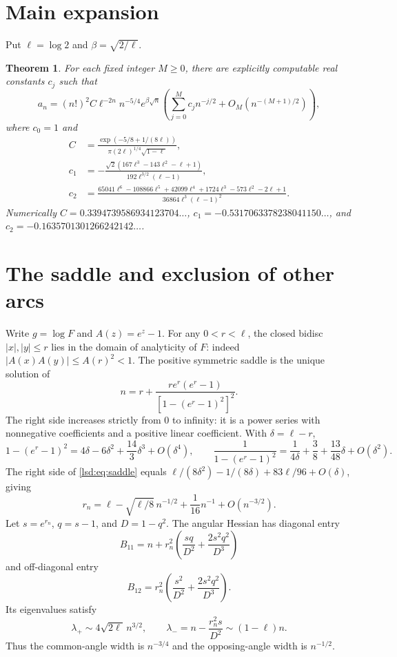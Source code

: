\documentclass[11pt]{article}
\newtheorem{theorem}{Theorem}
\theoremstyle{remark}\newtheorem{remark}{Remark}
\begin{document}
\section{Main expansion}
Put $\ell=\log 2$ and $\beta=\sqrt{2/\ell}$.
\begin{theorem}\label{lsd:thm:asympt}
For each fixed integer $M\geq0$, there are explicitly computable real constants $c_j$ such that
\begin{equation}\label{lsd:eq:main}
 a_n=(n!)^2 C\ell^{-2n}n^{-5/4}e^{\beta\sqrt n}
 \left(\sum_{j=0}^M c_j n^{-j/2}+O_M(n^{-(M+1)/2})\right),
\end{equation}
where $c_0=1$ and
\begin{align}
 C&=\frac{\exp(-5/8+1/(8\ell))}{\pi(2\ell)^{1/4}\sqrt{1-\ell}},\label{lsd:eq:C}\\
 c_1&=-\frac{\sqrt2(167\ell^3-143\ell^2-\ell+1)}{192\ell^{3/2}(\ell-1)},\label{lsd:eq:c1}\\
 c_2&=\frac{65041\ell^6-108866\ell^5+42099\ell^4+1724\ell^3-573\ell^2-2\ell+1}
 {36864\ell^3(\ell-1)^2}.\label{lsd:eq:c2}
\end{align}
Numerically $C=0.3394739586934123704\ldots$,
$c_1=-0.5317063378238041150\ldots$, and
$c_2=-0.1635701301266242142\ldots$.
\end{theorem}

\section{The saddle and exclusion of other arcs}
Write $g=\log F$ and $A(z)=e^z-1$. For any $0<r<\ell$, the closed bidisc $|x|,|y|\leq r$ lies in the domain of analyticity of $F$: indeed
$|A(x)A(y)|\leq A(r)^2<1$.
The positive symmetric saddle is the unique solution of
\begin{equation}\label{lsd:eq:saddle}
 n=r+\frac{re^r(e^r-1)}{[1-(e^r-1)^2]^2}.
\end{equation}
The right side increases strictly from $0$ to infinity: it is a power series with nonnegative coefficients and a positive linear coefficient. With $\delta=\ell-r$,
\[
1-(e^r-1)^2=4\delta-6\delta^2+\frac{14}{3}\delta^3+O(\delta^4),\qquad
\frac1{1-(e^r-1)^2}=\frac1{4\delta}+\frac38+\frac{13}{48}\delta+O(\delta^2).
\]
The right side of \eqref{lsd:eq:saddle} equals
$\ell/(8\delta^2)-1/(8\delta)+83\ell/96+O(\delta)$, giving
\[
 r_n=\ell-\sqrt{\ell/8}\,n^{-1/2}+\frac1{16}n^{-1}+O(n^{-3/2}).
\]
Let $s=e^{r_n}$, $q=s-1$, and $D=1-q^2$. The angular Hessian has diagonal entry
\[
 B_{11}=n+r_n^2\left(\frac{sq}{D^2}+\frac{2s^2q^2}{D^3}\right)
\]
and off-diagonal entry
\[
 B_{12}=r_n^2\left(\frac{s^2}{D^2}+\frac{2s^2q^2}{D^3}\right).
\]
Its eigenvalues satisfy
\begin{equation}\label{lsd:eq:eigenvalues}
 \lambda_+\sim4\sqrt{2\ell}\,n^{3/2},\qquad
 \lambda_-=n-\frac{r_n^2s}{D^2}\sim(1-\ell)n.
\end{equation}
Thus the common-angle width is $n^{-3/4}$ and the opposing-angle width is $n^{-1/2}$.
\end{document}
